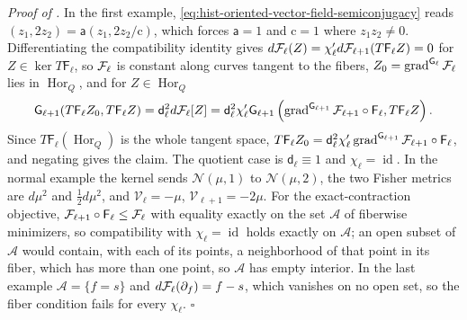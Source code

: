 \noindent\emph{Proof of .}
In the first example, \eqref{eq:hist-oriented-vector-field-semiconjugacy} reads
$(z_1,2z_2)=\mathsf a(z_1,2z_2/\mathrm c)$, which forces $\mathsf a=1$ and $\mathrm c=1$
where $z_1z_2\ne0$.  Differentiating the compatibility identity gives
$d\mathcal F_\ell(Z)=\chi_\ell'd\mathcal F_{\ell+1}(T\mathsf F_\ell Z)=0$ for
$Z\in\ker T\mathsf F_\ell$, so $\mathcal F_\ell$ is constant along curves tangent to the
fibers, $Z_0=\operatorname{grad}^{\mathsf G_\ell}\mathcal F_\ell$ lies in
$\operatorname{Hor}_Q$, and for $Z\in\operatorname{Hor}_Q$
\[
\mathsf G_{\ell+1}(T\mathsf F_\ell Z_0,T\mathsf F_\ell Z)
=\mathsf d_\ell^2d\mathcal F_\ell[Z]
=\mathsf d_\ell^2\chi_\ell'\mathsf G_{\ell+1}\left(\operatorname{grad}^{\mathsf
G_{\ell+1}}\mathcal F_{\ell+1}\circ\mathsf F_\ell,T\mathsf F_\ell Z\right).
\]
Since $T\mathsf F_\ell(\operatorname{Hor}_Q)$ is the whole tangent space,
$T\mathsf F_\ell Z_0=\mathsf d_\ell^2\chi_\ell'\operatorname{grad}^{\mathsf
G_{\ell+1}}\mathcal F_{\ell+1}\circ\mathsf F_\ell$, and negating gives the claim.  The
quotient case is $\mathsf d_\ell\equiv1$ and $\chi_\ell=\operatorname{id}$.  In the
normal example the kernel sends $\mathcal N(\mu,1)$ to $\mathcal N(\mu,2)$, the two
Fisher metrics are $d\mu^2$ and $\tfrac12d\mu^2$, and $\mathscr V_\ell=-\mu$,
$\mathscr V_{\ell+1}=-2\mu$.  For the exact-contraction objective,
$\mathcal F_{\ell+1}\circ\mathsf F_\ell\leq\mathcal F_\ell$ with equality exactly on the set
$\mathcal A$ of fiberwise minimizers, so compatibility with
$\chi_\ell=\operatorname{id}$ holds exactly on $\mathcal A$; an open subset of
$\mathcal A$ would contain, with each of its points, a neighborhood of that point in its
fiber, which has more than one point, so $\mathcal A$ has empty interior.  In the last
example $\mathcal A=\{f=s\}$ and $d\mathcal F_\ell(\partial_f)=f-s$, which vanishes on no
open set, so the fiber condition fails for every $\chi_\ell$.  $\square$
